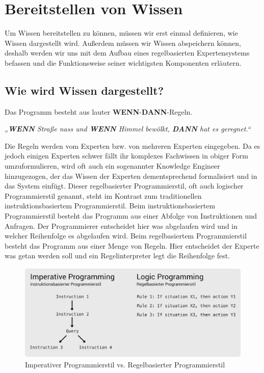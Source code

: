 \section{Bereitstellen von Wissen}
Um Wissen bereitstellen zu können, müssen wir erst einmal definieren, wie Wissen dargestellt wird. Außerdem müssen wir Wissen abspeichern können, deshalb werden wir uns mit dem Aufbau eines regelbasierten Expertensystems befassen und die Funktionsweise seiner wichtigsten Komponenten erläutern.
	
\subsection{Wie wird Wissen dargestellt?}
Das Programm besteht aus lauter \textbf{WENN}-\textbf{DANN}-Regeln.
\begin{center}
    \textit{„\textbf{WENN} Straße nass und \textbf{WENN} Himmel bewölkt, \textbf{DANN} hat es geregnet.“}
\end{center}

\noindent Die Regeln werden vom Experten bzw. von mehreren Experten eingegeben. Da es jedoch einigen Experten schwer fällt ihr komplexes Fachwissen in obiger Form umzuformulieren, wird oft auch ein sogenannter Knowledge Engineer hinzugezogen, der das Wissen der Experten dementsprechend formalisiert und in das System einfügt.
Dieser regelbasierter Programmierstil, oft auch logischer Programmierstil genannt, steht im Kontrast zum traditionellen instruktionsbasiertem Programmierstil.
Beim instruktionsbasiertem Programmierstil besteht das Programm aus einer Abfolge von Instruktionen und Anfragen. Der Programmierer entscheidet hier was abgelaufen wird  und in welcher Reihenfolge es abgelaufen wird.
Beim regelbasiertem Programmierstil besteht das Programm aus einer Menge von Regeln. Hier entscheidet der Experte was getan werden soll und ein Regelinterpreter legt die Reihenfolge fest.\\

\begin{figure}[htp]
    \centering
    \includegraphics[width=17cm]{chapters/expertensysteme/imperative_vs_rule_based}
    \caption{Imperativer Programmierstil vs. Regelbasierter Programmierstil}
    \label{fig:programmierstil}
\end{figure}

